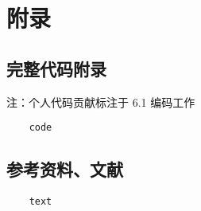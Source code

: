 
\chapter{附录}

\section{完整代码附录}
注：个人代码贡献标注于 6.1 编码工作
\begin{lstlisting}
    code
\end{lstlisting}
\section{参考资料、文献}
\begin{lstlisting}
    text
\end{lstlisting}
